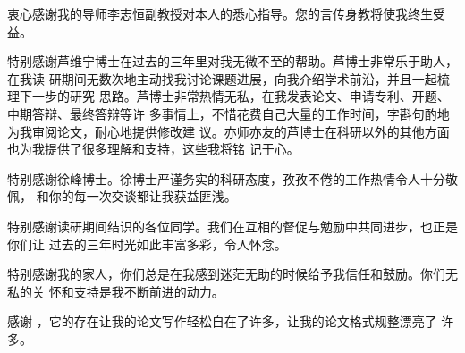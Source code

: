 \begin{acknowledgement}
  衷心感谢我的导师李志恒副教授对本人的悉心指导。您的言传身教将使我终生受益。

  特别感谢芦维宁博士在过去的三年里对我无微不至的帮助。芦博士非常乐于助人，在我读
  研期间无数次地主动找我讨论课题进展，向我介绍学术前沿，并且一起梳理下一步的研究
  思路。芦博士非常热情无私，在我发表论文、申请专利、开题、中期答辩、最终答辩等许
  多事情上，不惜花费自己大量的工作时间，字斟句酌地为我审阅论文，耐心地提供修改建
  议。亦师亦友的芦博士在科研以外的其他方面也为我提供了很多理解和支持，这些我将铭
  记于心。

  特别感谢徐峰博士。徐博士严谨务实的科研态度，孜孜不倦的工作热情令人十分敬佩，
  和你的每一次交谈都让我获益匪浅。

  特别感谢读研期间结识的各位同学。我们在互相的督促与勉励中共同进步，也正是你们让
  过去的三年时光如此丰富多彩，令人怀念。

  特别感谢我的家人，你们总是在我感到迷茫无助的时候给予我信任和鼓励。你们无私的关
  怀和支持是我不断前进的动力。

  感谢 \thuthesis，它的存在让我的论文写作轻松自在了许多，让我的论文格式规整漂亮了
  许多。
\end{acknowledgement}
